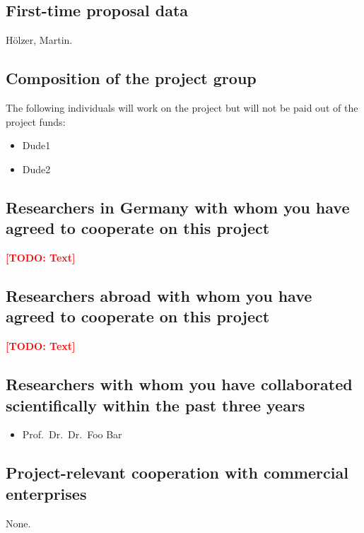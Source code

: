 \documentclass{scrartcl}
\newcommand{\todo}[1]{\xspace{\textcolor{red}{\bfseries[TODO: #1]}}\xspace}
\begin{document}
\subsection{First-time proposal data}
H\"olzer, Martin.

\subsection{Composition of the project group}
The following individuals will work on the project but will not be paid out of
the project funds:

\begin{itemize}
\item Dude1
\item Dude2
\end{itemize}

\subsection{Researchers in Germany with whom you have agreed to cooperate on this project}
\todo{Text}

\subsection{Researchers abroad with whom you have agreed to cooperate on this project}
\todo{Text}

\subsection{Researchers with whom you have collaborated scientifically within the past three years}
\begin{itemize}
  \item Prof.\ Dr.\ Dr.\ Foo Bar
\end{itemize}

\subsection{Project-relevant cooperation with commercial enterprises}
None.
\end{document}
